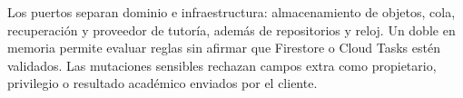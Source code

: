 Los puertos separan dominio e infraestructura: almacenamiento de objetos, cola, recuperación y proveedor de tutoría, además de repositorios y reloj. Un doble en memoria permite evaluar reglas sin afirmar que Firestore o Cloud Tasks estén validados. Las mutaciones sensibles rechazan campos extra como propietario, privilegio o resultado académico enviados por el cliente.

